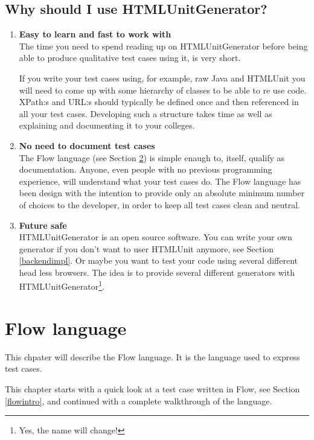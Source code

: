 \documentclass[a4paper,11pt]{kth-mag}
\begin{document}
\section{Why should I use HTMLUnitGenerator?}
\begin{enumerate}
\item \textbf{Easy to learn and fast to work with}\\
The time you need to spend reading up on HTMLUnitGenerator before being able to produce qualitative test cases using it, is very short.

If you write your test cases using, for example, raw Java and HTMLUnit you will need to come up with some hierarchy of classes to be able to re use code. XPath:s and URL:s should typically be defined once and then referenced in all your test cases. Developing such a structure takes time as well as explaining and documenting it to your colleges.

\item \textbf{No need to document test cases}\\
The Flow language (see Section \ref{flowlanguage}) is simple enaugh to, itself, qualify as documentation. Anyone, even people with no previous programming experience, will understand what your test cases do. The Flow language has been design with the intention to provide only an absolute minimum number of choices to the developer, in order to keep all test cases clean and neutral.

\item \textbf{Future safe}\\
HTMLUnitGenerator is an open source software. You can write your own generator if you don't want to user HTMLUnit anymore, see Section \ref{backendimpl}. Or maybe you want to test your code using several different head less browsers. The idea is to provide several different generators with HTMLUnitGenerator\footnote{Yes, the name will change!}.
\end{enumerate}

\chapter{Flow language}
\label{flowlanguage}
This chpater will describe the Flow language. It is the language used to express test cases.

This chapter starts with a quick look at a test case written in Flow, see Section \ref{flowintro}, and continued with a complete walkthrough of the language. 
\end{document}
